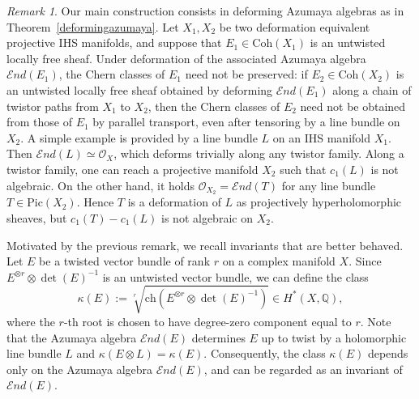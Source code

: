 \documentclass[12pt,a4paper]{amsart}
\theoremstyle{plain}
\theoremstyle{definition}
\theoremstyle{remark}
\newtheorem{rmk}[thm]{Remark}
\def\Pic{\mathrm{Pic}}
\def\ch{\mathrm{ch}}
\def\Coh{\mathrm{Coh}}
\def\H{H}
\def\kO{\mathcal{O}}
\newcommand{\cc}{c}
\newcommand{\cEnd}{\mathcal{E}nd}
\begin{document}
\begin{rmk}
Our main construction consists in deforming Azumaya algebras as in Theorem~\ref{deformingazumaya}. Let $X_1, X_2$ be two deformation equivalent projective IHS manifolds, and suppose that $E_1\in\Coh(X_1)$ is an untwisted locally free sheaf. Under deformation of the associated Azumaya algebra $\cEnd(E_1)$, the Chern classes of $E_1$ need not be preserved: if $E_2\in\Coh(X_2)$ is an untwisted locally free sheaf obtained by deforming $\cEnd(E_1)$ along a chain of twistor paths from $X_1$ to $X_2$, then the Chern classes of $E_2$ need not be obtained from those of $E_1$ by parallel transport, even after tensoring by a line bundle on $X_2$. A simple example is provided by a line bundle $L$ on an IHS manifold $X_1$. Then $\cEnd(L)\simeq \mathcal{O}_X$, which deforms trivially along any twistor family. Along a twistor family, one can reach a projective  manifold $X_2$ such that $\cc_1(L)$ is not algebraic. On the other hand, it holds $\kO_{X_2}=\cEnd(T)$ for any line bundle $T\in \Pic(X_2)$. Hence $T$ is a deformation of $L$ as projectively hyperholomorphic sheaves, but $\cc_1(T)-\cc_1(L)$ is not algebraic on $X_2$.
\end{rmk}

Motivated by the previous remark, we recall invariants that are better behaved. Let $E$ be a twisted vector bundle of rank $r$ on a complex manifold $X$. Since $E^{\otimes r}\otimes \det(E)^{-1}$ is an untwisted vector bundle, we can define the class \begin{equation}\label{eq_def_kappa}
    \kappa(E):=\sqrt[r]{\ch(E^{\otimes r}\otimes \det(E)^{-1})}\in \H^*(X,\mathbb{Q}),
\end{equation} 
where the $r$-th root is chosen to have degree-zero component equal to $r$. 
Note that the Azumaya algebra $\cEnd(E)$ determines $E$ up to twist by a holomorphic line bundle $L$ and $\kappa(E\otimes L)=\kappa(E)$. Consequently, the class $\kappa(E)$ depends only on the Azumaya algebra $\mathcal{E}nd(E)$, and can be regarded as an invariant of $\mathcal{E}nd(E)$.
\end{document}
